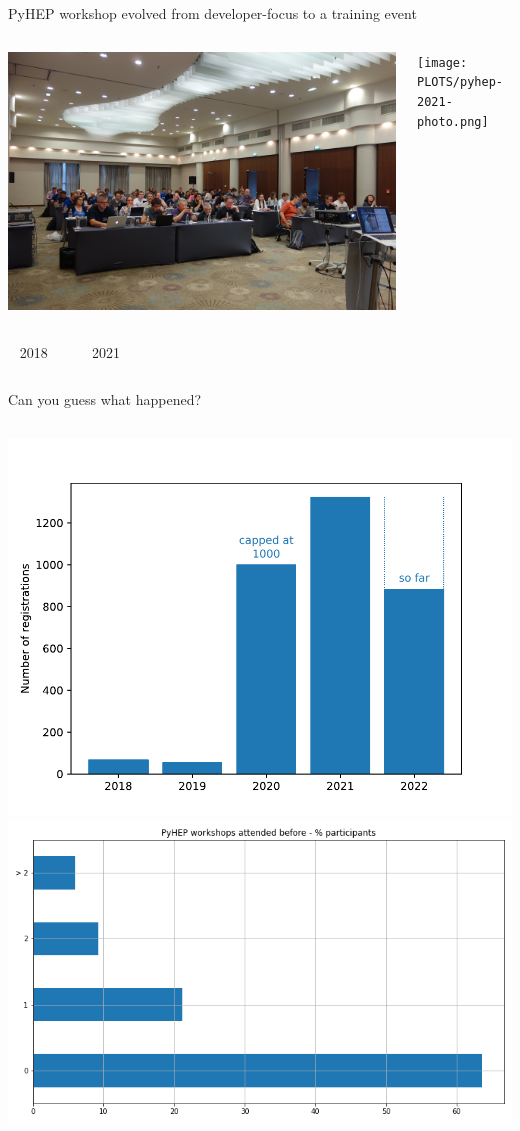 \documentclass[aspectratio=169]{beamer}
\begin{document}
\begin{frame}{PyHEP workshop evolved from developer-focus to a training event}
\Large
\vspace{0.35 cm}

\begin{columns}
\includegraphics[width=\linewidth]{PLOTS/pyhep-2018-photo.jpg}

\texttt{[image: PLOTS/pyhep-2021-photo.png]}

\end{columns}

\vspace{0.1 cm}
\begin{columns}
\mbox{ } \hfill 2018 \hfill \mbox{ }

\mbox{ } \hfill 2021 \hfill \mbox{ }

\end{columns}
\end{frame}

\begin{frame}{Can you guess what happened?}
\begin{columns}
\includegraphics[height=5 cm]{PLOTS/pyhep-num-registrations.pdf}\includegraphics[height=5 cm]{PLOTS/registrations_nr_pyhep_attended.png}
\end{columns}
\end{frame}
\end{document}
